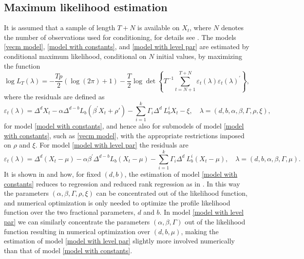 \documentclass[article]{jss}
\begin{document}
\subsection{Maximum likelihood estimation}

It is assumed that a sample of length $T+N$ is available on $X_t$, where $N$ denotes the number of observations used for conditioning, for details see \cite{johansen2014initial}. The models \eqref{vecm model}, \eqref{model with constants}, and \eqref{model with level par} are estimated by conditional maximum likelihood, conditional on $N$ initial values, by maximizing the function
\begin{equation}
\log L_{T}(\lambda ) = - \frac{T p}{2} ( \log(2\pi) + 1) 
-\frac{T}{2}\log \det \left\{ T^{-1}\sum_{t=N+1}^{T+N}\varepsilon _{t}(\lambda )\varepsilon _{t}(\lambda)^{\prime }\right\},  \label{Cond Like}
\end{equation}
where the residuals are defined as
\begin{equation}
\varepsilon _{t}(\lambda ) = \Delta^{d}X_{t}- \alpha \Delta^{d-b} L_{b} (\beta^{\prime} X_{t} + \rho') 
 - \sum_{i=1}^{k}\Gamma_{i}\Delta^{d}\ L_{b}^{i}X_{t} - \xi, \quad
\lambda =(d,b,\alpha,\beta,\Gamma,\rho,\xi),
\label{epstau}
\end{equation}
for model \eqref{model with constants}, and hence also for submodels of model \eqref{model with constants}, such as \eqref{vecm model}, with the appropriate restrictions imposed on $\rho$ and $\xi$. For model \eqref{model with level par} the residuals are
\begin{equation}
\varepsilon _{t}(\lambda ) = \Delta^{d}(X_{t}-\mu) -  \alpha \beta^{\prime} \Delta^{d-b} L_{b} (X_{t} - \mu) 
 - \sum_{i=1}^{k}\Gamma_{i}\Delta^{d}\ L_{b}^{i}(X_{t} - \mu), \quad
\lambda =(d,b,\alpha,\beta,\Gamma,\mu).
\label{epstau level}
\end{equation}
It is shown in \cite{johansen2012likelihood} and \cite{Dolatabadi2014} how, for fixed $(d,b)$, the estimation of model \eqref{model with constants} reduces to regression and reduced rank regression as in \cite{Johansen1995}. In this way the parameters $(\alpha ,\beta,\Gamma,\rho,\xi)$ can be concentrated out of the likelihood function, and numerical optimization is only needed to optimize the profile likelihood function over the two fractional parameters, $d$ and $b$. In model \eqref{model with level par} we can similarly concentrate the parameters $(\alpha ,\beta,\Gamma)$ out of the likelihood function resulting in numerical optimization over $(d,b,\mu)$, making the estimation of model \eqref{model with level par} slightly more involved numerically than that of model \eqref{model with constants}.
\end{document}
